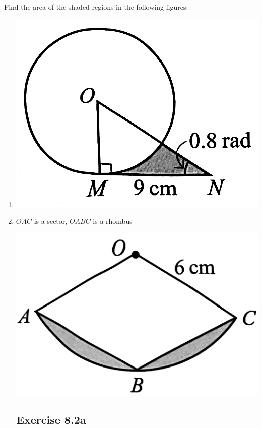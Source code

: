 \documentclass{report}
\newcommand{\exercise}[1]{%
    \subsection*{\faPencil\ \ Exercise #1\hspace{0.5em}\xrfill[0.175\baselineskip]{1pt}}
}
\begin{document}
Find the area of the shaded regions in the following figures:
\begin{multicols}{2}
    \begin{enumerate}[label=(\alph*)]
        \item \includegraphics[scale=0.12,valign=t]{assets/8-15.png}
        \item $OAC$ is a sector, $OABC$ is a rhombus
        
        \vspace{0.5em}
        \includegraphics[scale=0.12]{assets/8-16.png}
    \end{enumerate}
\end{multicols}

\newpage

\exercise{8.2a}
\end{document}
